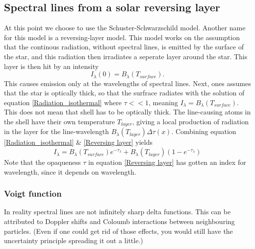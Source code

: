 \documentclass{aa}   %
\begin{document}
\subsection{Spectral lines from a solar reversing layer}
At this point we choose to use the Schuster-Schwarzschild model. Another name for this model is a reversing-layer model.
This model works on the assumption that the continous radiation, without spectral lines, is emitted by the surface of the star, and this radiation then irradiates a seperate layer around the star.
This layer is then hit by an intensity
\begin{equation}
 I_\lambda(0) = B_\lambda(T_{surface}).
\end{equation}\label{Surface layer}
This causes emission only at the wavelengths of spectral lines. 
Next, ones assumes that the star is optically thick, so that the surfrace radiates with the solution of equation \ref{Radiation_isothermal} where $\tau << 1$, meaning $I_\lambda = B_\lambda(T_{surface})$. This does not mean that shell has to be optically thick. The line-causing atoms in the shell have their own temperature $T_{layer}$, giving a local production of radiation in the layer for the line-wavelength $B_\lambda(T_{layer})\Delta\tau(x)$. Combining equation \ref{Radiation_isothermal} \& \ref{Reversing layer} yields
\begin{equation}
 I_\lambda =B_\lambda(T_{surface})e^{-\tau_\lambda} + B_\lambda(T_{layer})(1 - e^{-\tau_\lambda})
\end{equation}\label{Reversing layer}
Note that the opaqueness $\tau$ in equation \ref{Reversing layer} has gotten an index for wavelength, since it depends on wavelength.

\subsubsection{Voigt function}
In reality spectral lines are not infinitely sharp delta functions. This can be attributed to Doppler shifts and Coloumb interactions between neighbouring particles. (Even if one could get rid of those effects, you would still have the uncertainty principle spreading it out a little.)
\end{document}

